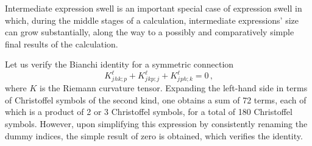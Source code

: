 Intermediate expression swell is an important special case of expression swell in which, during the middle stages of a calculation, intermediate expressions' size can grow substantially, along the way to a possibly and comparatively simple final results of the calculation.
%
\begin{example}
  Let us verify the Bianchi identity for a symmetric connection
  \begin{equation*}
    K^{\ell}_{j}{}_{hk;p} + K^{\ell}_{j}{}_{kp;j} + K^{\ell}_{j}{}_{ph;k} = 0 \, \text{,}
  \end{equation*}
  where $K$ is the Riemann curvature tensor. Expanding the left-hand side in terms of Christoffel symbols of the second kind, one obtains a sum of 72 terms, each of which is a product of 2 or 3 Christoffel symbols, for a total of 180 Christoffel symbols. However, upon simplifying this expression by consistently renaming the dummy indices, the simple result of zero is obtained, which verifies the identity.

\end{example}
